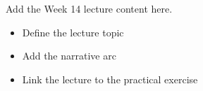 Add the Week 14 lecture content here.

\begin{itemize}
  \item Define the lecture topic
  \item Add the narrative arc
  \item Link the lecture to the practical exercise
\end{itemize}
